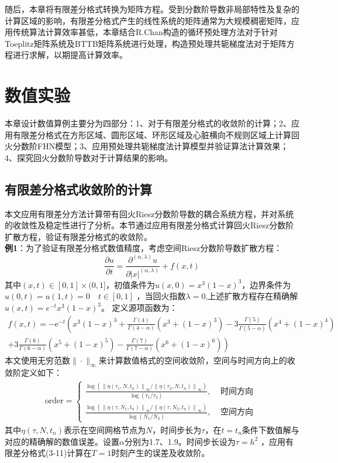 \documentclass[twoside,UTF8]{nputhesis}
\begin{document}
随后，本章将有限差分格式转换为矩阵方程。受到分数阶导数非局部特性及复杂的计算区域的影响，有限差分格式产生的线性系统的矩阵通常为大规模稠密矩阵，应用传统算法计算效率甚低，本章结合R.Chan构造的循环预处理方法对于针对Toeplitz矩阵系统及BTTB矩阵系统进行处理，构造预处理共轭梯度法对于矩阵方程进行求解，以期提高计算效率。

\clearpage


\chapter{数值实验}
本章设计数值算例主要分为四部分：1、对于有限差分格式的收敛阶的计算；2、应用有限差分格式在方形区域、圆形区域、环形区域及心脏横向不规则区域上计算回火分数阶FHN模型；3、应用预处理共轭梯度法计算模型并验证算法计算效果；4、探究回火分数阶导数对于计算结果的影响。
 \section{有限差分格式收敛阶的计算}
本文应用有限差分方法计算带有回火Riesz分数阶导数的耦合系统方程，并对系统的收敛性及稳定性进行了分析。本节通过应用有限差分格式计算回火Riesz分数阶扩散方程，验证有限差分格式的收敛阶。\\
\textbf{例1}：为了验证有限差分格式数值精度，考虑空间Riesz分数阶导数扩散方程：
\[
\frac{\partial u}{\partial t}=\frac{\partial^{(\alpha, \lambda)} u}{\partial|x|^{(\alpha, \lambda)}}+f(x, t)
\]
其中$(x,t)\in [0,1]\times (0,1]$，初值条件为$u(x,0)=x^{3}\left(1-x\right)^{3}$，边界条件为$u(0,t)=u(1,t)=0\quad t\in [0,1]$ ，当回火指数$\lambda = 0$,上述扩散方程存在精确解$u(x, t)=e^{-t}x^{3}\left(1-x\right)^{3}$。
定义源项函数为：
\[
\begin{aligned}
f(x, t)=-\mathrm{e}^{-t}\left(x^{3}(1-x)^{3}+\frac{\Gamma(4)}{\Gamma(4-\alpha)}\left(x^{3}+(1-x)^{3}\right)-3 \frac{\Gamma(5)}{\Gamma(5-\alpha)}\left(x^{4}+(1-x)^{4}\right)\right.\\
\left.+3 \frac{\Gamma(6)}{\Gamma(6-\alpha)}\left(x^{5}+(1-x)^{5}\right)-\frac{\Gamma(7)}{\Gamma(7-\alpha)}\left(x^{6}+(1-x)^{6}\right)\right)
\end{aligned}
\]
本文使用无穷范数$\|\cdot\|_{\infty}$来计算数值格式的空间收敛阶，空间与时间方向上的收敛阶定义如下：
\begin{align*}
\text {order}=\left\{\begin{array}{ll}{\frac{\log \left(\left\|\eta\left(\tau_{1}, N, t_{n}\right)\right\|_{\infty}  /\left\|\eta\left(\tau_{2}, N, t_{n}\right)\right\|_{\infty} \right)}{\log \left(\tau_{1} / \tau_{2}\right)},} & {\text { 时间方向 }} \\
{\frac{\log \left(\left\|\eta\left(\tau, N_{1}, t_{n}\right)\right\|_{\infty}  /\left\|\eta\left(\tau, N_{2}, t_{n}\right)\right\|_{\infty} \right)}{\log \left(N_{1} / N_{2}\right)},} & {\text { 空间方向 }}\end{array}\right.
\end{align*}
其中$\eta\left(\tau, N, t_{n}\right)$表示在空间网格节点为$N$，时间步长为$\tau$，在$t=t_{n}$条件下数值解与对应的精确解的数值误差。设置$\alpha $分别为1.7、1.9。时间步长设为$\tau=h^{2}$ ，应用有限差分格式(3-11)计算在$T=1$时刻产生的误差及收敛阶。
\end{document}
